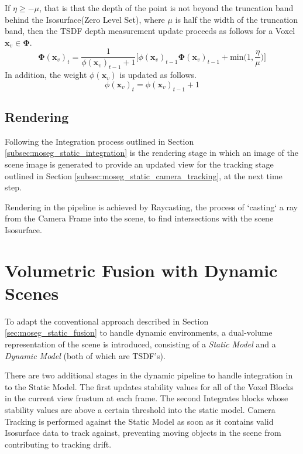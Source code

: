 If $\eta \geq -\mu$, that is that the depth of the point is not beyond the
truncation band behind the Isosurface(Zero Level Set), where $\mu$ is half the
width of the truncation band, then the TSDF depth measurement update proceeds as
follows for a Voxel $\mathbf{x}_{v} \in \mathbf{\Phi}$.
\begin{equation}
\label{eqn:sdf_update}
\mathbf{\Phi}(\mathbf{x}_{v})_{t} = \frac{1}{\phi(\mathbf{x}_{v})_{t-1} + 1}
\bigg[\phi(\mathbf{x}_{v})_{t-1}\mathbf{\mathbf{\Phi}}(\mathbf{x}_{v})_{t-1} +
\text{min} \bigg( 1, \frac{\eta}{\mu} \bigg)
\bigg]
\end{equation}
In addition, the weight $\phi(\mathbf{x}_{v})$ is updated as follows.
\begin{equation}
  \label{eqn:sdf_weight_update}
  \phi(\mathbf{x}_{v})_{t} = \phi(\mathbf{x}_{v})_{t-1} + 1
\end{equation}

\subsection{Rendering}
\label{subsec:moseg_static_rendering}
Following the Integration process outlined in Section
\ref{subsec:moseg_static_integration} is the rendering stage in which an image
of the scene image is generated to provide an updated view for the tracking
stage outlined in Section \ref{subsec:moseg_static_camera_tracking}, at the next
time step.

Rendering in the pipeline is achieved by Raycasting, the process of `casting` a
ray from the Camera Frame into the scene, to find intersections with the scene
Isosurface. 

\section{Volumetric Fusion with Dynamic Scenes}
\label{sec:moseg_dynamic_fusion}
To adapt the conventional approach described in Section
\ref{sec:moseg_static_fusion} to handle dynamic environments, a dual-volume
representation of the scene is introduced, consisting of a \emph{Static Model}
and a \emph{Dynamic Model} (both of which are TSDF's).

There are two additional stages in the dynamic pipeline to handle integration in
to the Static Model. The first updates stability values for all of the Voxel
Blocks in the current view frustum at each frame. The second Integrates blocks
whose stability values are above a certain threshold into the static model.
Camera Tracking is performed against the Static Model as soon as it contains
valid Isosurface data to track against, preventing moving objects in the scene
from contributing to tracking drift.

